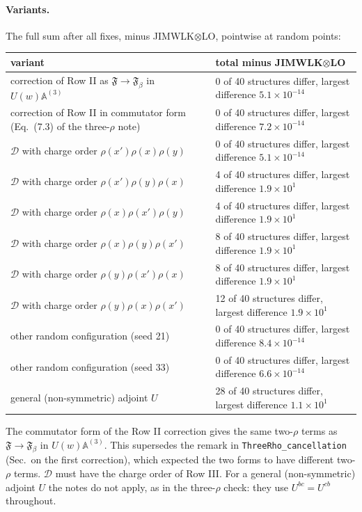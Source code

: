 \documentclass[10pt]{article}
\numberwithin{equation}{section}
\begin{document}
\paragraph{Variants.} The full sum after all fixes, minus JIMWLK$\otimes$LO, pointwise at random points:
\begin{center}\small
\begin{tabular}{@{}l l@{}}
variant & total minus JIMWLK$\otimes$LO\\ \hline
correction of Row II as $\mathfrak F\to\mathfrak F_\beta$ in $U(w)\mathbb A^{(3)}$ & 0 of 40 structures differ, largest difference $5.1\times10^{-14}$\\
correction of Row II in commutator form (Eq.~(7.3) of the three-$\rho$ note) & 0 of 40 structures differ, largest difference $7.2\times10^{-14}$\\
$\mathcal D$ with charge order $\rho(x')\rho(x)\rho(y)$ & 0 of 40 structures differ, largest difference $5.1\times10^{-14}$\\
$\mathcal D$ with charge order $\rho(x')\rho(y)\rho(x)$ & 4 of 40 structures differ, largest difference $1.9\times10^{1}$\\
$\mathcal D$ with charge order $\rho(x)\rho(x')\rho(y)$ & 4 of 40 structures differ, largest difference $1.9\times10^{1}$\\
$\mathcal D$ with charge order $\rho(x)\rho(y)\rho(x')$ & 8 of 40 structures differ, largest difference $1.9\times10^{1}$\\
$\mathcal D$ with charge order $\rho(y)\rho(x')\rho(x)$ & 8 of 40 structures differ, largest difference $1.9\times10^{1}$\\
$\mathcal D$ with charge order $\rho(y)\rho(x)\rho(x')$ & 12 of 40 structures differ, largest difference $1.9\times10^{1}$\\
other random configuration (seed 21) & 0 of 40 structures differ, largest difference $8.4\times10^{-14}$\\
other random configuration (seed 33) & 0 of 40 structures differ, largest difference $6.6\times10^{-14}$\\
general (non-symmetric) adjoint $U$ & 28 of 40 structures differ, largest difference $1.1\times10^{1}$\\
\end{tabular}
\end{center}
The commutator form of the Row II correction gives the same two-$\rho$ terms as $\mathfrak F\to\mathfrak F_\beta$ in $U(w)\mathbb A^{(3)}$. This supersedes the remark in \texttt{ThreeRho\_cancellation} (Sec.~on the first correction), which expected the two forms to have different two-$\rho$ terms. $\mathcal D$ must have the charge order of Row III. For a general (non-symmetric) adjoint $U$ the notes do not apply, as in the three-$\rho$ check: they use $U^{bc}=U^{cb}$ throughout.
\end{document}
